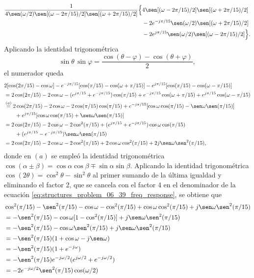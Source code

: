 \documentclass[a4paper]{report}
\begin{document}
\begin{equation}\label{eq:structures_problem_06_39_freq_response_tmp}
 \begin{aligned}
   \frac{1}{4\sen(\omega/2)\sen[(\omega-2\pi/15)/2]\sen[(\omega+2\pi/15)/2]}
 \Big\{&
   4\sen[(\omega-2\pi/15)/2]\sen[(\omega+2\pi/15)/2]\\
 &-2e^{-j\pi/15}\sen(\omega/2)\sen[(\omega+2\pi/15)/2]\\
 &-2e^{j\pi/15}\sen(\omega/2)\sen[(\omega-2\pi/15)/2]
 \Big\}.
 \end{aligned}
\end{equation}
Aplicando la identidad trigonométrica 
\[
 \sin\theta\,\sin\varphi=\frac{\cos(\theta-\varphi)-\cos(\theta+\varphi)}{2},
\]
el numerador queda
\begin{align*}
 &2[\cos(2\pi/15)-\cos\omega]-e^{-j\pi/15}[\cos(\pi/15)-\cos(\omega+\pi/15)]-e^{j\pi/15}[\cos(\pi/15)-\cos(\omega-\pi/15)]\\
 &=2\cos(2\pi/15)-2\cos\omega-(e^{j\pi/15}+e^{-j\pi/15})\cos(\pi/15)+e^{-j\pi/15}\cos(\omega+\pi/15)+e^{j\pi/15}\cos(\omega-\pi/15)\\
 &\overset{(a)}{=}2\cos(2\pi/15)-2\cos\omega-2\cos(\pi/15)\cos(\pi/15)+e^{-j\pi/15}[\cos\omega\cos(\pi/15)-\sen\omega\sen(\pi/15)]\\
 &\qquad+e^{j\pi/15}[\cos\omega\cos(\pi/15)+\sen\omega\sen(\pi/15)]\\
 &=2\cos(2\pi/15)-2\cos\omega-2\cos^2(\pi/15)+(e^{j\pi/15}+e^{-j\pi/15})\cos\omega\cos(\pi/15)\\
 &\qquad+(e^{j\pi/15}-e^{-j\pi/15})\sen\omega\sen(\pi/15)\\
 &=2\cos(2\pi/15)-2\cos\omega-2\cos^2(\pi/15)+2\cos\omega\cos^2(\pi/15)+2j\sen\omega\sen^2(\pi/15),
\end{align*}
donde en \((a)\) se empleó la identidad trigonométrica \(\cos(\alpha\pm\beta)=\cos\alpha\cos\beta\mp\sin\alpha\sin\beta\). Aplicando la identidad trigonométrica \(\cos(2\theta )=\cos^{2}\theta-\sin^{2}\theta\) al primer sumando de la última igualdad y eliminando el factor 2, que se cancela con el factor 4 en el denominador de la ecuación \ref{eq:structures_problem_06_39_freq_response}, se obtiene que 
\begin{align*}
 &\cos^2(\pi/15)-\sen^2(\pi/15)-\cos\omega-\cos^2(\pi/15)+\cos\omega\cos^2(\pi/15)+j\sen\omega\sen^2(\pi/15)\\
 &=-\sen^2(\pi/15)-\cos\omega[1-\cos^2(\pi/15)]+j\sen\omega\sen^2(\pi/15)\\
 &=-\sen^2(\pi/15)-\cos\omega\sen^2(\pi/15)+j\sen\omega\sen^2(\pi/15)\\
 &=-\sen^2(\pi/15)(1+\cos\omega-j\sen\omega)\\
 &=-\sen^2(\pi/15)(1+e^{-j\omega})\\
 &=-\sen^2(\pi/15)e^{-j\omega/2}(e^{j\omega/2}+e^{-j\omega/2})\\
 &=-2e^{-j\omega/2}\sen^2(\pi/15)\cos(\omega/2)
\end{align*}
\end{document}
